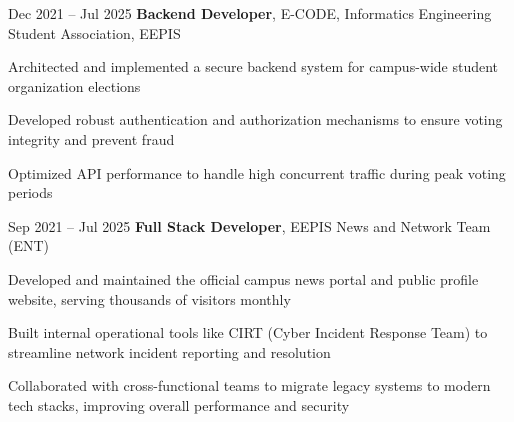 \vspace{0.5 cm}

\begin{twocolentrydate}{Dec 2021 -- Jul 2025}
	\textbf{Backend Developer}, E-CODE, Informatics Engineering Student Association, EEPIS
\end{twocolentrydate}

\vspace{0.10 cm}
\begin{onecolentry}
	\begin{highlights}
		\item Architected and implemented a secure backend system for campus-wide student organization elections
		\item Developed robust authentication and authorization mechanisms to ensure voting integrity and prevent fraud
		\item Optimized API performance to handle high concurrent traffic during peak voting periods
	\end{highlights}
\end{onecolentry}

\vspace{0.5 cm}

\begin{twocolentrydate}{Sep 2021 -- Jul 2025}
	\textbf{Full Stack Developer}, EEPIS News and Network Team (ENT)
\end{twocolentrydate}

\vspace{0.10 cm}
\begin{onecolentry}
	\begin{highlights}
		\item Developed and maintained the official campus news portal and public profile website, serving thousands of visitors monthly
		\item Built internal operational tools like CIRT (Cyber Incident Response Team) to streamline network incident reporting and resolution
		\item Collaborated with cross-functional teams to migrate legacy systems to modern tech stacks, improving overall performance and security
	\end{highlights}
\end{onecolentry}
